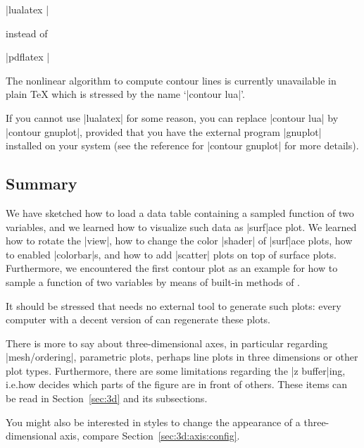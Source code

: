 |lualatex |

\noindent instead of

|pdflatex |

The nonlinear algorithm to
compute contour lines is currently unavailable in plain \TeX{} which is stressed
by the name `|contour lua|'. 


If you cannot use |lualatex| for some reason, you can replace |contour lua| by |contour gnuplot|, provided that you have the external program |gnuplot| installed on your system (see the reference for |contour gnuplot| for more details).

\subsection{Summary}

We have sketched how to load a data table containing a sampled function of two
variables, and we learned how to visualize such data as |surf|ace plot. We
learned how to rotate the |view|, how to change the color |shader| of |surf|ace
plots, how to enabled |colorbar|s, and how to add |scatter| plots on top of
surface plots. Furthermore, we encountered the first contour plot as an example
for how to sample a function of two variables by means of built-in methods of
\PGFPlots{}.

It should be stressed that \PGFPlots{} needs no external tool to generate such
plots: every computer with a decent version of \PGFPlots{} can regenerate these plots.

There is more to say about three-dimensional axes, in particular regarding
|mesh/ordering|, parametric plots, perhaps line plots in three dimensions or
other plot types. Furthermore, there are some limitations regarding the
|z buffer|ing, i.e.\@ how \PGFPlots{} decides which parts of the figure are in
front of others. These items can be read in Section~\ref{sec:3d} and its
subsections.

You might also be interested in styles to change the appearance of a
three-dimensional axis, compare Section~\ref{sec:3d:axis:config}.

